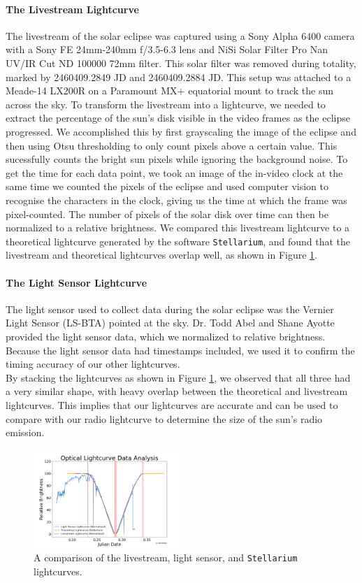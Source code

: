 \paragraph{The Livestream Lightcurve}
The livestream of the solar eclipse was captured using a Sony Alpha 6400 camera with a Sony FE 24mm-240mm f/3.5-6.3 lens and NiSi Solar Filter Pro Nan UV/IR Cut ND 100000 72mm filter.
This solar filter was removed during totality, marked by 2460409.2849 JD and 2460409.2884 JD.
This setup was attached to a Meade-14 LX200R on a Paramount MX+ equatorial mount to track the sun across the sky.
To transform the livestream into a lightcurve, we needed to extract the percentage of the sun's disk visible in the video frames as the eclipse progressed.
We accomplished this by first grayscaling the image of the eclipse and then using Otsu thresholding to only count pixels above a certain value.
This sucessfully counts the bright sun pixels while ignoring the background noise.
To get the time for each data point, we took an image of the in-video clock at the same time we counted the pixels of the eclipse and used computer vision to recognise the characters in the clock, giving us the time at which the frame was pixel-counted.
The number of pixels of the solar disk over time can then be normalized to a relative brightness.
We compared this livestream lightcurve to a theoretical lightcurve generated by the software \texttt{Stellarium}\cite{zotti_simulated_2020}, and found that the livestream and theoretical lightcurves overlap well, as shown in Figure \ref{fig:OpticalLightcurveComparison}.
\paragraph{The Light Sensor Lightcurve}
The light sensor used to collect data during the solar eclipse was the Vernier Light Sensor (LS-BTA) pointed at the sky.
Dr. Todd Abel and Shane Ayotte provided the light sensor data, which we normalized to relative brightness.
Because the light sensor data had timestamps included, we used it to confirm the timing accuracy of our other lightcurves.
\\
By stacking the lightcurves as shown in Figure \ref{fig:OpticalLightcurveComparison}, we observed that all three had a very similar shape, with heavy overlap between the theoretical and livestream lightcurves.
This implies that our lightcurves are accurate and can be used to compare with our radio lightcurve to determine the size of the sun's radio emission.

\begin{figure}[h]
    \includegraphics[width=0.5\textwidth]{figures/OpticalLightcurveComparison}
    \caption{\label{fig:OpticalLightcurveComparison} A comparison of the livestream, light sensor, and \texttt{Stellarium} lightcurves.}
\end{figure}
